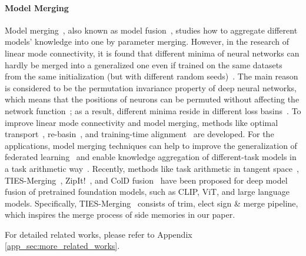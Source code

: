 \paragraph{Model Merging}
Model merging~\cite{mergekit}, also known as model fusion~\cite{deep_model_fusion_survey,otfusion}, studies how to aggregate different models' knowledge into one by parameter merging. However, in the research of linear mode connectivity, it is found that different minima of neural networks can hardly be merged into a generalized one even if trained on the same datasets from the same initialization (but with different random seeds)~\cite{perm_role_lmc,git_rebasin}. The main reason is considered to be the permutation invariance property of deep neural networks, which means that the positions of neurons can be permuted without affecting the network function~\cite{perm_role_lmc}; as a result, different minima reside in different loss basins~\cite{git_rebasin}. To improve linear mode connectivity and model merging, methods like optimal transport~\cite{otfusion,formerotfusion}, re-basin~\cite{git_rebasin}, and training-time alignment~\cite{tna} are developed. For the applications, model merging techniques can help to improve the generalization of federated learning~\cite{fedlaw,fedma} and enable knowledge aggregation of different-task models in a task arithmetic way~\cite{task_arithmetic,task_arithmetic_tangent}. Recently, methods like task arithmetic in tangent space~\cite{task_arithmetic_tangent}, TIES-Merging~\cite{ties_merge}, ZipIt!~\cite{zipit}, and ColD fusion~\cite{cold_fusion} have been proposed for deep model fusion of pretrained foundation models, such as CLIP, ViT, and large language models. Specifically, TIES-Merging~\cite{ties_merge} consists of trim, elect sign \& merge pipeline, which inspires the merge process of side memories in our paper.


For detailed related works, please refer to Appendix \ref{app_sec:more_related_works}.


